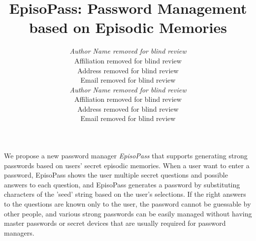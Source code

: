 \documentclass{article}
\begin{document}

\title{EpisoPass: Password Management based on Episodic Memories}

\author{
\parbox[t]{9cm}{\centering
	     {\em Author Name removed for blind review}\\
	     Affiliation removed for blind review\\
	     Address removed for blind review\\
	     Email removed for blind review}
\parbox[t]{9cm}{\centering
	     {\em Author Name removed for blind review}\\
	     Affiliation removed for blind review\\
	     Address removed for blind review\\
	     Email removed for blind review}
}

\maketitle

\abstract

We propose a new password manager \textit{EpisoPass} that supports
generating strong passwords based on users' secret episodic memories.
When a user want to enter a password,
EpisoPass shows the user multiple secret questions and possible answers to
each question, and
EpisoPass generates a password by substituting characters of the
'seed' string based on the user's selections.
If the right answers to the questions are known only to the user,
the password cannot be guessable by other people, and
various strong passwords can be easily managed
without having master passwords or secret devices that are
usually required for password managers.

\end{document}
